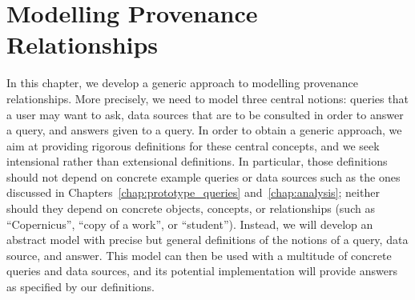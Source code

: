 \chapter{Modelling Provenance Relationships}
\label{chap:modelling}

In this chapter, we develop a generic approach to modelling provenance relationships.
More precisely, we need to model three central notions: queries that a user may want to ask,
data sources that are to be consulted in order to answer a query,
and answers given to a query.
In order to obtain a generic approach, we aim at providing rigorous definitions
for these central concepts, and we seek intensional rather than extensional definitions.
In particular, those definitions should not depend on concrete example queries or data sources
such as the ones discussed in Chapters~\ref{chap:prototype_queries} and~\ref{chap:analysis};
neither should they depend on concrete objects, concepts, or relationships
(such as \enquote{Copernicus}, \enquote{copy of a work}, or \enquote{student}).
Instead, we will develop an abstract model with precise but general definitions
of the notions of a query, data source, and answer.
This model can then be used with a multitude of concrete queries and data sources,
and its potential implementation will provide answers as specified by our definitions.

